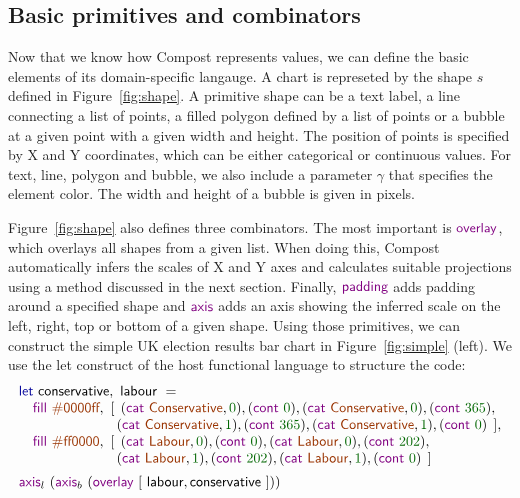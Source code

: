 \documentclass{jfp}
\newcommand{\num}[1]{\textcolor{numclr}{#1}}
\newcommand{\strf}[1]{\textnormal{\textcolor{strclr}{\sffamily #1}}}
\newcommand{\ident}[1]{\textnormal{\textcolor{idclr}{\sffamily #1}}}
\newcommand{\kvd}[1]{\textnormal{\textcolor{kvdclr}{\sffamily #1}}}
\newcommand{\fkvd}[1]{\textnormal{\textcolor{fkvdclr}{\sffamily #1}}}
\begin{document}
\subsection{Basic primitives and combinators}
\label{sec:basic-primitives}

Now that we know how Compost represents values, we can define the basic elements of its
domain-specific langauge. A chart is represeted by the shape $s$ defined in Figure~\ref{fig:shape}.
A primitive shape can be a text label, a line connecting a list of points, a filled polygon
defined by a list of points or a bubble at a given point with a given width and height.
The position of points is specified by X and Y coordinates, which can be either categorical or
continuous values. For text, line, polygon and bubble, we also include a parameter $\gamma$
that specifies the element color. The width and height of a bubble is given in pixels.

Figure~\ref{fig:shape} also defines three combinators. The most important is $\kvd{overlay}$,
which overlays all shapes from a given list. When doing this, Compost automatically infers the
scales of X and Y axes and calculates suitable projections using a method discussed in the next
section. Finally, $\kvd{padding}$ adds padding around a specified shape and $\kvd{axis}$ adds
an axis showing the inferred scale on the left, right, top or bottom of a given shape.
Using those primitives, we can construct the simple UK election results bar chart in Figure~\ref{fig:simple} (left).
We use the \fkvd{let} construct of the host functional language to structure the code:
%
\begin{equation*}
\begin{array}{l}
\fkvd{let}~\ident{conservative},~\ident{labour}~=\\
\quad \kvd{fill}~\strf{\#0000ff},
 ~[\;\,(\kvd{cat}~\strf{Conservative}, \num{0}), (\kvd{cont}~\num{0}), (\kvd{cat}~\strf{Conservative}, \num{0}), (\kvd{cont}~\num{365}),\\
\hspace{6.7em}\;(\kvd{cat}~\strf{Conservative}, \num{1}), (\kvd{cont}~\num{365}), (\kvd{cat}~\strf{Conservative}, \num{1}), (\kvd{cont}~\num{0})\;\,],\\
\quad \kvd{fill}~\strf{\#ff0000},
 ~[\;\,(\kvd{cat}~\strf{Labour}, \num{0}), (\kvd{cont}~\num{0}), (\kvd{cat}~\strf{Labour}, \num{0}), (\kvd{cont}~\num{202}),\\
\hspace{6.7em}\;(\kvd{cat}~\strf{Labour}, \num{1}), (\kvd{cont}~\num{202}), (\kvd{cat}~\strf{Labour}, \num{1}), (\kvd{cont}~\num{0})\,\;]\\[0.5em]
\kvd{axis}_l~(\kvd{axis}_b~(\kvd{overlay}~[~\ident{labour}, \ident{conservative}~]))\\
\end{array}
\end{equation*}
\end{document}
